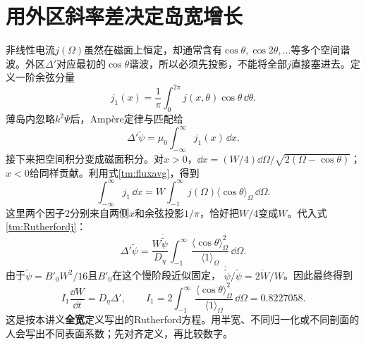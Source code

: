 \section{用外区斜率差决定岛宽增长}
非线性电流$j(\Omega)$虽然在磁面上恒定，却通常含有$\cos\theta,\cos2\theta,\ldots$等多个空间谐波。外区$\Delta'$对应最初的$\cos\theta$谐波，所以必须先投影，不能将全部$j$直接塞进去。定义一阶余弦分量
\begin{equation}
 j_1(x)=\frac1{\pi}\int_0^{2\pi}j(x,\theta)\cos\theta\,\dd\theta.
\end{equation}
薄岛内忽略$k^2\Psi$后，Amp\`ere定律与匹配给
\begin{equation}
 \Delta'\widetilde\psi
 =\mu_0\int_{-\infty}^{\infty}j_1(x)\,\dd x.
 \label{tm:Rutherfordmatch}
\end{equation}
接下来把空间积分变成磁面积分。对$x>0$，$\dd x=(W/4)\dd\Omega/\sqrt{2(\Omega-\cos\theta)}$；$x<0$给同样贡献。利用式\eqref{tm:fluxavg}，得到
\begin{equation}
 \int_{-\infty}^{\infty}j_1\,\dd x
 =W\int_{-1}^{\infty}j(\Omega)\langle\cos\theta\rangle_\Omega\,\dd\Omega.
\end{equation}
这里两个因子2分别来自两侧$x$和余弦投影$1/\pi$，恰好把$W/4$变成$W$。代入式\eqref{tm:Rutherfordj}：
\begin{equation}
 \Delta'\widetilde\psi=
 \frac{W\dot{\widetilde\psi}}{D_\eta}
 \int_{-1}^{\infty}
 \frac{\langle\cos\theta\rangle_\Omega^2}{\langle1\rangle_\Omega}\,\dd\Omega.
\end{equation}
由于$\widetilde\psi=B'_0W^2/16$且$B'_0$在这个慢阶段近似固定，
$\dot{\widetilde\psi}/\widetilde\psi=2\dot W/W$。因此最终得到
\begin{equation}
 \boxed{I_1\frac{\dd W}{\dd t}=D_\eta\Delta',\qquad
 I_1=2\int_{-1}^{\infty}
 \frac{\langle\cos\theta\rangle_\Omega^2}{\langle1\rangle_\Omega}\,\dd\Omega
 =0.8227058.}
 \label{tm:Rutherford}
\end{equation}
这是按本讲义\textbf{全宽}定义写出的Rutherford方程。用半宽、不同归一化或不同剖面的人会写出不同表面系数；先对齐定义，再比较数字。\citep{TMFitzRutherford}

